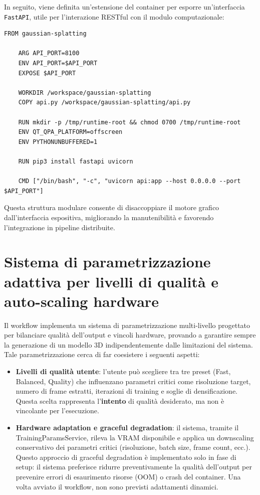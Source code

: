 In seguito, viene definita un'estensione del container per esporre un'interfaccia \texttt{FastAPI}, utile per l'interazione RESTful con il modulo computazionale:

\begin{lstlisting}[language=docker, caption={Estensione API FastAPI per Gaussian Splatting}, label={lst:dockerfile_api}]
	FROM gaussian-splatting
	
	ARG API_PORT=8100
	ENV API_PORT=$API_PORT
	EXPOSE $API_PORT
	
	WORKDIR /workspace/gaussian-splatting
	COPY api.py /workspace/gaussian-splatting/api.py
	
	RUN mkdir -p /tmp/runtime-root && chmod 0700 /tmp/runtime-root
	ENV QT_QPA_PLATFORM=offscreen
	ENV PYTHONUNBUFFERED=1
	
	RUN pip3 install fastapi uvicorn
	
	CMD ["/bin/bash", "-c", "uvicorn api:app --host 0.0.0.0 --port $API_PORT"]
\end{lstlisting}

Questa struttura modulare consente di disaccoppiare il motore grafico dall’interfaccia espositiva, migliorando la manutenibilità e favorendo l’integrazione in pipeline distribuite.
\newpage
\section{Sistema di parametrizzazione adattiva per livelli di qualità e auto-scaling hardware}

Il workflow implementa un sistema di parametrizzazione multi-livello progettato per bilanciare qualità dell'output e vincoli hardware, provando a garantire sempre la generazione di un modello 3D indipendentemente dalle limitazioni del sistema. Tale parametrizzazione cerca di far coesistere i seguenti aspetti:

\begin{itemize}
	\item \textbf{Livelli di qualità utente}: l'utente può scegliere tra tre preset (Fast, Balanced, Quality) che influenzano parametri critici come risoluzione target, numero di frame estratti, iterazioni di training e soglie di densificazione. Questa scelta rappresenta l'\textbf{intento} di qualità desiderato, ma non è vincolante per l'esecuzione.
	
	\item \textbf{Hardware adaptation e graceful degradation}: il sistema, tramite il TrainingParamsService, rileva la VRAM disponibile e applica un downscaling conservativo dei parametri critici (risoluzione, batch size, frame count, ecc.). Questo approccio di graceful degradation è implementato solo in fase di setup: il sistema preferisce ridurre preventivamente la qualità dell’output per prevenire errori di esaurimento risorse (OOM) o crash del container. Una volta avviato il workflow, non sono previsti adattamenti dinamici.

\end{itemize}

